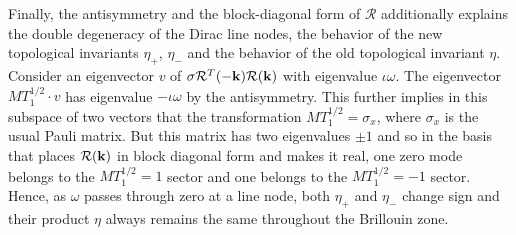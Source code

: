 \documentclass[a4paper,aps,prl,floatfix,showpacs,superscriptaddress,notitlepage]{revtex4-1}
\begin{document}
Finally, the antisymmetry and the block-diagonal form of ${\mathcal R}$ additionally explains the double degeneracy of the Dirac line nodes, the behavior of the new topological invariants $\eta_+$, $\eta_-$ and the behavior of the old topological invariant $\eta$. Consider an eigenvector $v$ of ${\bf{\sigma}} {\mathcal R}^T(-{\bf{k}}) {\mathcal R}({\bf{k}})$ with eigenvalue $\iota\omega$. The eigenvector $MT_1^{1/2}\cdot v$ has eigenvalue $-\iota\omega$ by the antisymmetry. This further implies in this subspace of two vectors that the transformation $MT_1^{1/2} = \sigma_x$, where $\sigma_x$ is the usual Pauli matrix. But this matrix has two eigenvalues $\pm1$ and so in the basis that places ${\mathcal R}({\bf{k}})$ in block diagonal form and makes it real, one zero mode belongs to the $MT_1^{1/2}= 1$ sector and one belongs to the $MT_1^{1/2}=- 1$ sector. Hence, as $\omega$ passes through zero at a line node, both $\eta_+$ and $\eta_-$ change sign and their product $\eta$ always remains the same throughout the Brillouin zone.




\end{document}
